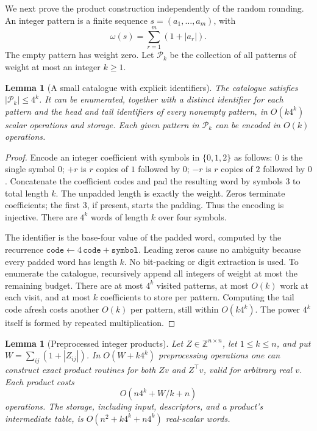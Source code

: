 \documentclass[11pt,a4paper]{article}
\newtheorem{lemma}[theorem]{Lemma}
\theoremstyle{remark}
\newcommand{\Z}{\mathbb Z}
\begin{document}
We next prove the product construction independently of the random rounding.
An integer pattern is a finite sequence $s=(a_1,\ldots,a_m)$, with
\[
 \omega(s)=\sum_{r=1}^m(1+|a_r|).
\]
The empty pattern has weight zero. Let $\mathcal P_k$ be the collection of all
patterns of weight at most an integer $k\ge1$.

\begin{lemma}[A small catalogue with explicit identifiers]\label{lem:catalogue}
The catalogue satisfies $|\mathcal P_k|\le4^k$. It can be enumerated, together
with a distinct identifier for each pattern and the head and tail identifiers
of every nonempty pattern, in $O(k4^k)$ scalar operations and storage.
Each given pattern in $\mathcal P_k$ can be encoded in $O(k)$ operations.
\end{lemma}

\begin{proof}
Encode an integer coefficient with symbols in $\{0,1,2\}$ as follows:
$0$ is the single symbol $0$; $+r$ is $r$ copies of $1$ followed by $0$;
$-r$ is $r$ copies of $2$ followed by $0$. Concatenate the coefficient codes
and pad the resulting word by symbols $3$ to total length $k$.
The unpadded length is exactly the weight. Zeros terminate coefficients;
the first $3$, if present, starts the padding. Thus the encoding is injective.
There are $4^k$ words of length $k$ over four symbols.

The identifier is the base-four value of the padded word, computed by the
recurrence $\texttt{code}\leftarrow4\,\texttt{code}+\texttt{symbol}$.
Leading zeros cause no ambiguity because every padded word has length $k$.
No bit-packing or digit extraction is used. To enumerate the catalogue,
recursively append all integers of weight at most the remaining budget.
There are at most $4^k$ visited patterns, at most $O(k)$ work at each visit,
and at most $k$ coefficients to store per pattern. Computing the tail code
afresh costs another $O(k)$ per pattern, still within $O(k4^k)$.
The power $4^k$ itself is formed by repeated multiplication.
\end{proof}

\begin{lemma}[Preprocessed integer products]\label{lem:product}
Let $Z\in\Z^{n\times n}$, let $1\le k\le n$, and put
$W=\sum_{ij}(1+|Z_{ij}|)$. In $O(W+k4^k)$ preprocessing operations one can
construct exact product routines for both $Zv$ and $Z^\top v$, valid for
arbitrary real $v$. Each product costs
\begin{equation}\label{eq:productcost}
 O(n4^k+W/k+n)
\end{equation}
operations. The storage, including input, descriptors, and a product's
intermediate table, is $O(n^2+k4^k+n4^k)$ real-scalar words.
\end{lemma}
\end{document}
